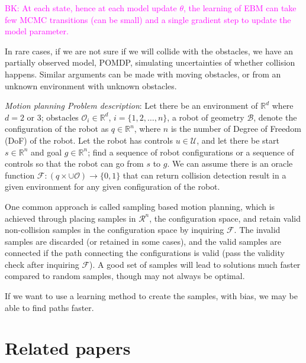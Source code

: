 \documentclass{article}
\begin{document}
\textcolor{magenta}{BK: At each state, hence at each model update $\theta$, the learning of EBM can take few MCMC transitions (can be small) and a single gradient step to update the model parameter.}

In rare cases, if we are not sure if we will collide with the obstacles, we have an partially observed model, POMDP, simulating uncertainties of whether collision happens. Similar arguments can be made with moving obstacles, or from an unknown environment with unknown obstacles. 


\noindent\textit{Motion planning Problem description}: Let there be an environment of $\mathbb{R}^d$ where $d = 2$ or $3$; obstacles $\mathcal{O}_i\in\mathbb{R}^d$, $i = \{1, 2, \ldots, n\}$, a robot of geometry $\mathcal{B}$, denote the configuration of the robot as $q\in\mathbb{R}^n$, where $n$ is the number of Degree of Freedom (DoF) of the robot. Let the robot has controls $u\in\mathcal{U}$, and let there be start $s\in\mathbb{R}^n$ and goal $g\in\mathbb{R}^n$; find a sequence of robot configurations or a sequence of controls so that the robot can go from $s$ to $g$. We can assume there is an oracle function $\mathcal{F}:(q\times \cup\mathcal{O})\rightarrow \{0, 1\}$ that can return collision detection result in a given environment for any given configuration of the robot. 

One common approach is called sampling based motion planning, which is achieved through placing samples in $\mathcal{R}^n$, the configuration space, and retain valid non-collision samples in the configuration space by inquiring $\mathcal{F}$. The invalid samples are discarded (or retained in some cases), and the valid samples are connected if the path connecting the configurations is valid (pass the validity check after inquiring $\mathcal{F}$). A good set of samples will lead to solutions much faster compared to random samples, though may not always be optimal. 

If we want to use a learning method to create the samples, with bias, we may be able to find paths faster. 



\section{Related papers}
\end{document}
